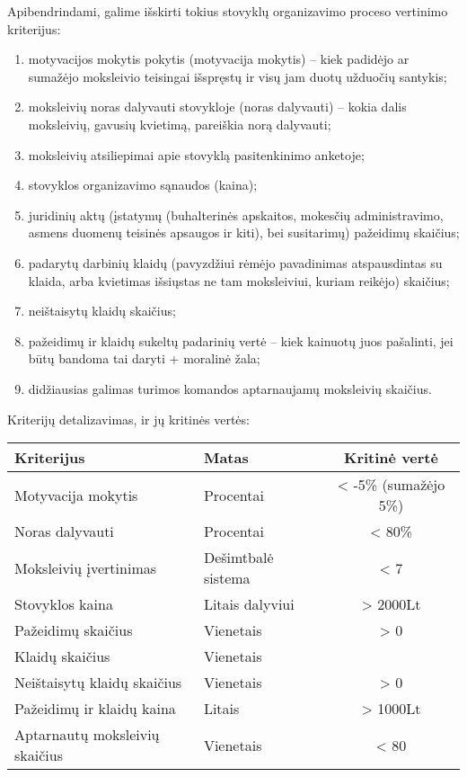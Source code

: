Apibendrindami, galime išskirti tokius stovyklų organizavimo proceso 
vertinimo kriterijus:
\begin{enumerate}
  \item motyvacijos mokytis pokytis (motyvacija mokytis) – kiek padidėjo
    ar sumažėjo moksleivio teisingai išspręstų ir visų jam duotų užduočių
    santykis;
  \item moksleivių noras dalyvauti stovykloje (noras dalyvauti) – kokia 
    dalis moksleivių, gavusių kvietimą, pareiškia norą dalyvauti;
  \item moksleivių atsiliepimai apie stovyklą pasitenkinimo anketoje;
  \item stovyklos organizavimo sąnaudos (kaina);
  \item juridinių aktų (įstatymų (buhalterinės apskaitos,
    mokesčių administravimo, asmens duomenų teisinės apsaugos
    ir kiti), bei susitarimų) pažeidimų skaičius;
  \item padarytų darbinių klaidų (pavyzdžiui rėmėjo pavadinimas 
    atspausdintas su klaida, arba kvietimas išsiųstas ne tam moksleiviui, 
    kuriam reikėjo) skaičius;
  \item neištaisytų klaidų skaičius;
  \item pažeidimų  ir klaidų sukeltų padarinių vertė – kiek kainuotų juos 
    pašalinti, jei būtų bandoma tai daryti + moralinė žala;
  \item didžiausias galimas turimos komandos aptarnaujamų moksleivių 
    skaičius.
\end{enumerate}

Kriterijų detalizavimas, ir jų kritinės vertės:

\begin{tabular}[]{| l | p{2.2cm} | c |}
  \hline
  Kriterijus & Matas & Kritinė vertė \\
  \hline
  Motyvacija mokytis & Procentai & < -5\% (sumažėjo 5\%) \\
  \hline
  Noras dalyvauti & Procentai & < 80\% \\
  \hline
  Moksleivių įvertinimas & Dešimtbalė sistema & < 7 \\
  \hline
  Stovyklos kaina & Litais dalyviui & > 2000Lt \\
  \hline
  Pažeidimų skaičius & Vienetais & > 0 \\
  \hline
  Klaidų skaičius & Vienetais & \\
  \hline
  Neištaisytų klaidų skaičius & Vienetais & > 0 \\
  \hline
  Pažeidimų ir klaidų kaina & Litais & > 1000Lt \\
  \hline
  Aptarnautų moksleivių skaičius & Vienetais & < 80 \\
  \hline
\end{tabular}

